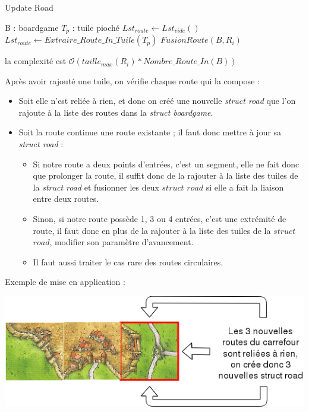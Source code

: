 \vspace{0.5cm}

\begin{algorithm}[!h]
\caption{ Update Road}
\begin{algorithmic} [!h]
\REQUIRE  B : boardgame
\REQUIRE  $T_p $ : tuile pioché
\STATE $Lst_{route} \leftarrow Lst_{vide}()$
\STATE $Lst_{route} \leftarrow Extraire\_Route\_In\_Tuile(T_p) $
\STATE $FusionRoute(B,R_i)$
\ENDFOR
\end{algorithmic}
\end{algorithm}

la complexité est $\mathcal{O}(taille_{max}(R_i) * Nombre\_Route\_In(B))$ 

Après avoir rajouté une tuile, on vérifie chaque route qui la compose :
\begin{itemize}
    \item Soit elle n'est reliée à rien, et donc on créé une nouvelle \textit{struct road} que l'on rajoute à la liste des routes dans la \textit{struct boardgame}.
    \item Soit la route continue une route existante ; il faut donc mettre à jour sa \textit{struct road} :
    \begin{itemize}
        \item Si notre route a deux points d'entrées, c'est un segment, elle ne fait donc que prolonger la route, il suffit donc de la rajouter à la liste des tuiles de la \textit{struct road} et fusionner les deux $struct$ $road$ si elle a fait la liaison entre deux routes.
        \item Sinon, si notre route possède 1, 3 ou 4 entrées, c'est une extrémité de route, il faut donc en plus de la rajouter à la liste des tuiles de la $struct$ $road$, modifier son paramètre d'avancement.
        \item Il faut aussi traiter le cas rare des routes circulaires.
    \end{itemize}
\end{itemize}


\vspace{0.5cm}

Exemple de mise en application :

\vspace{0.5cm}

\hspace{-0.5cm}
\includegraphics[scale=0.8]{routeModif2.png}
\vspace{0.5cm}

